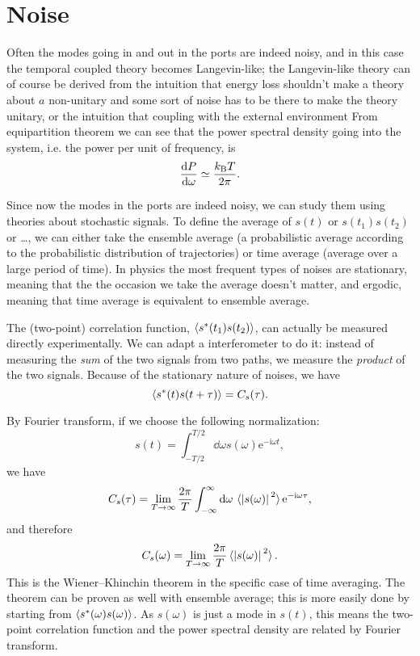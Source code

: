 \documentclass[hyperref, a4paper]{article}
\newcommand*{\ii}{\mathrm{i}}
\newcommand*{\ee}{\mathrm{e}}
\newcommand*{\kB}{k_{\text{B}}}
\begin{document}
\section{Noise}

Often the modes going in and out in the ports are indeed noisy, 
and in this case the temporal coupled theory becomes Langevin-like; 
the Langevin-like theory can of course be derived from 
the intuition that energy loss shouldn't make a theory about $a$  non-unitary 
and some sort of noise has to be there to make the theory unitary, 
or the intuition that coupling with the external environment 
From equipartition theorem we can see that the power spectral density going into the system, 
i.e. the power per unit of frequency, is 
\begin{equation}
    \dv{P}{\omega} \simeq \frac{\kB T}{2 \pi}.
\end{equation}

Since now the modes in the ports are indeed noisy, 
we can study them using theories about stochastic signals.
To define the average of $s(t)$ or $s(t_1) s(t_2)$ or \dots,
we can either take the ensemble average 
(a probabilistic average according to the probabilistic distribution of trajectories) 
or time average (average over a large period of time).
In physics the most frequent types of noises are stationary, 
meaning that the the occasion we take the average doesn't matter, 
and ergodic, meaning that time average is equivalent to ensemble average. 

The (two-point) correlation function, $\expval{s^*(t_1) s(t_2)}$, 
can actually be measured directly experimentally.
We can adapt a interferometer to do it: 
instead of measuring the \emph{sum} of the two signals from two paths, 
we measure the \emph{product} of the two signals.
Because of the stationary nature of noises, 
we have 
\begin{equation}
    \expval{s^*(t) s(t + \tau)} = C_s(\tau).
\end{equation}

By Fourier transform, if we choose the following normalization: 
\begin{equation}
    s(t) = \int_{-T/2}^{T/2} \dd{\omega} s(\omega) \ee^{- \ii \omega t}, 
\end{equation}
we have 
\begin{equation}
    C_s(\tau) = \lim_{T \to \infty} \frac{2\pi}{T} 
    \int_{-\infty}^{\infty} \dd{\omega} \expval*{\abs*{s(\omega)}^2} \ee^{- \ii \omega \tau},
\end{equation}
and therefore 
\begin{equation}
    C_s(\omega) = \lim_{T \to \infty} \frac{2\pi}{T} \expval*{\abs*{s(\omega)}^2}.
\end{equation}
This is the Wiener–Khinchin theorem in the specific case of time averaging.
The theorem can be proven as well with ensemble average; 
this is more easily done by starting from $\expval{s^*(\omega) s(\omega)}$. 
As $s(\omega)$ is just a mode in $s(t)$, 
this means the two-point correlation function and the power spectral density 
are related by Fourier transform.
\end{document}
